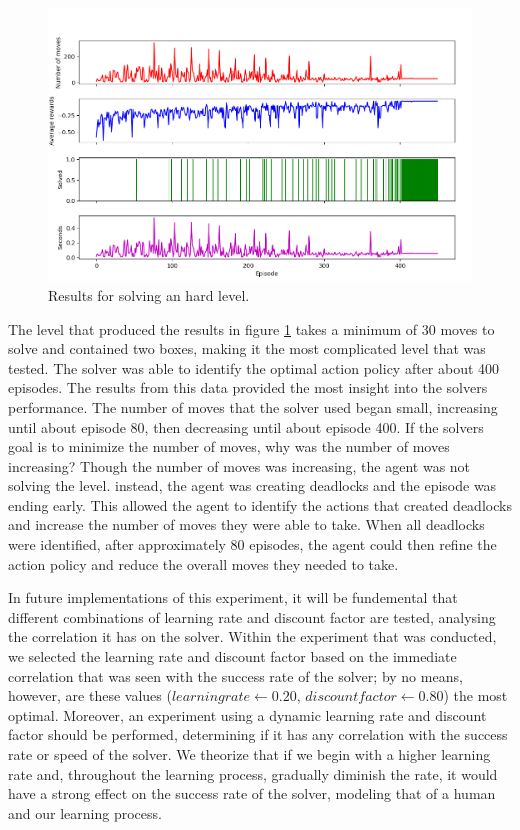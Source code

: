 \documentclass[times, 10pt,twocolumn]{article}
\begin{document}
\begin{figure}[h] 
  \centering
     \includegraphics[width=\linewidth]{images/hard_graph.png}
  \caption{Results for solving an hard level.}
  \label{fig:h}
\end{figure}

The level that produced the results in figure \ref{fig:h} takes a minimum of 30 moves to solve and contained two boxes, making it the most complicated level that was tested. The solver was able to identify the optimal action policy after about 400 episodes. The results from this data provided the most insight into the solvers performance. The number of moves that the solver used began small, increasing until about episode 80, then decreasing until about episode 400. If the solvers goal is to minimize the number of moves, why was the number of moves increasing? Though the number of moves was increasing, the agent was not solving the level. instead, the agent was creating deadlocks and the episode was ending early. This allowed the agent to identify the actions that created deadlocks and increase the number of moves they were able to take. When all deadlocks were identified, after approximately 80 episodes, the agent could then refine the action policy and reduce the overall moves they needed to take.


In future implementations of this experiment, it will be fundemental that different combinations of learning rate and discount factor are tested, analysing the correlation it has on the solver.  Within the experiment that was conducted, we selected the learning rate and discount factor based on the immediate correlation that was seen with the success rate of the solver; by no means, however, are these values ($learning rate \gets 0.20$, $discount factor \gets 0.80$) the most optimal.  Moreover, an experiment using a dynamic learning rate and discount factor should be performed, determining if it has any correlation with the success rate or speed of the solver.  We theorize that if we begin with a higher learning rate and, throughout the learning process, gradually diminish the rate, it would have a strong effect on the success rate of the solver, modeling that of a human and our learning process.
\end{document}
